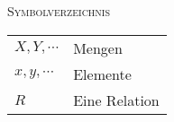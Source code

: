 \documentclass[a4paper]{amsart}
\theoremstyle{definition}
\begin{document}
\begin{large}
    \centerline{\textsc{Symbolverzeichnis}}
\end{large}
\bigskip

\renewcommand*{\arraystretch}{1}

\begin{tabular}{ll}
    $X, Y, \cdots$          & Mengen\\
    $x, y, \cdots$             & Elemente\\
    $R$             & Eine Relation
   
\end{tabular}
\end{document}
